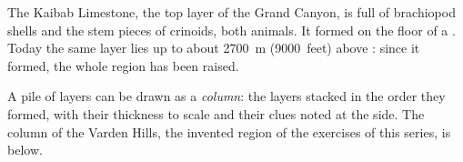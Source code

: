 \begin{example}\label{ex:g7:sediments-and-fossils:kaibab}
The Kaibab Limestone, the top layer of the Grand Canyon, is full of
brachiopod shells and the stem pieces of crinoids, both  animals. It
formed on the floor of a . Today the same layer lies up to about
\qty{2700}{m} (\num{9000}~feet) above : since it formed, the
whole region has been raised.
\end{example}

A pile of layers can be drawn as a \emph{column}: the layers stacked in
the order they formed, with their thickness to scale and their clues
noted at the side. The column of the Varden Hills, the invented region
of the exercises of this series, is below.

